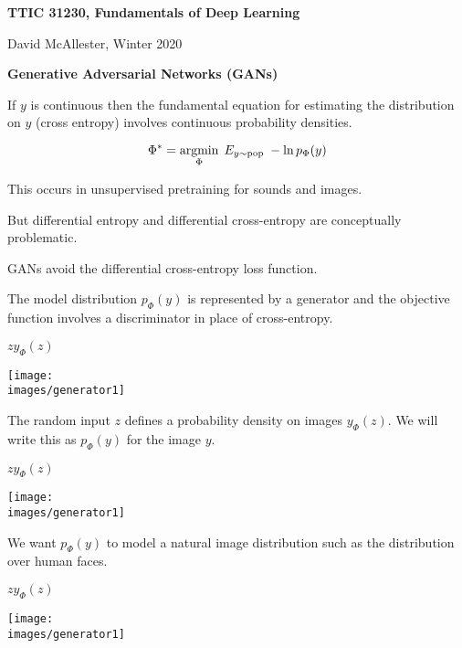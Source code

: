 





{\Huge

  \centerline{\bf TTIC 31230, Fundamentals of Deep Learning}
  \bigskip
  \centerline{David McAllester, Winter 2020}
  \vfill
  \centerline{\bf Generative Adversarial Networks (GANs)}
\vfill
\vfill



If $y$ is continuous then the fundamental equation for estimating the distribution on $y$ (cross entropy) involves continuous probability densities.

\vfill
$$\Phi^* = \operatorname*{argmin}_\Phi \;E_{y \sim \mathrm{pop}}\;-\ln p_\Phi(y)$$

\vfill
This occurs in unsupervised pretraining for sounds and images.

\vfill
But differential entropy and differential cross-entropy are conceptually problematic.


GANs avoid the differential cross-entropy loss function.

\vfill
The model distribution $p_\Phi(y)$ is represented by a generator and the objective function involves a
discriminator in place of cross-entropy.


\bigskip
\centerline{$z$\hspace{5in}$y_\Phi(z)$}
\centerline{\texttt{[image: \\images/generator1]}}

\bigskip
The random input $z$ defines a probability density on images $y_\Phi(z)$.  We will write this as $p_\Phi(y)$ for the image $y$.


\bigskip
\centerline{$z$\hspace{5in}$y_\Phi(z)$}
\centerline{\texttt{[image: \\images/generator1]}}

\bigskip
We want $p_\Phi(y)$ to model a natural image distribution such as the distribution over human faces.



\bigskip
\centerline{$z$\hspace{5in}$y_\Phi(z)$}
\centerline{\texttt{[image: \\images/generator1]}}

}

